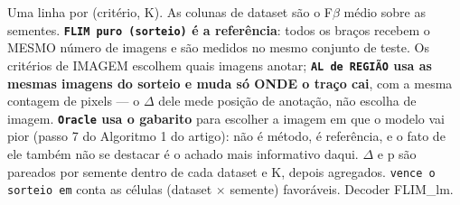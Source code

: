 \footnotesize Uma linha por (critério, K). As colunas de dataset são o F$\beta$ médio sobre as sementes. \textbf{\texttt{FLIM puro (sorteio)} é a referência}: todos os braços recebem o MESMO número de imagens e são medidos no mesmo conjunto de teste. Os critérios de IMAGEM escolhem quais imagens anotar; \textbf{\texttt{AL de REGIÃO} usa as mesmas imagens do sorteio e muda só ONDE o traço cai}, com a mesma contagem de pixels --- o $\Delta$ dele mede posição de anotação, não escolha de imagem. \textbf{\texttt{Oracle} usa o gabarito} para escolher a imagem em que o modelo vai pior (passo 7 do Algoritmo 1 do artigo): não é método, é referência, e o fato de ele também não se destacar é o achado mais informativo daqui. $\Delta$ e p são pareados por semente dentro de cada dataset e K, depois agregados. \texttt{vence o sorteio em} conta as células (dataset $\times$ semente) favoráveis. Decoder FLIM\_lm.
\normalsize
